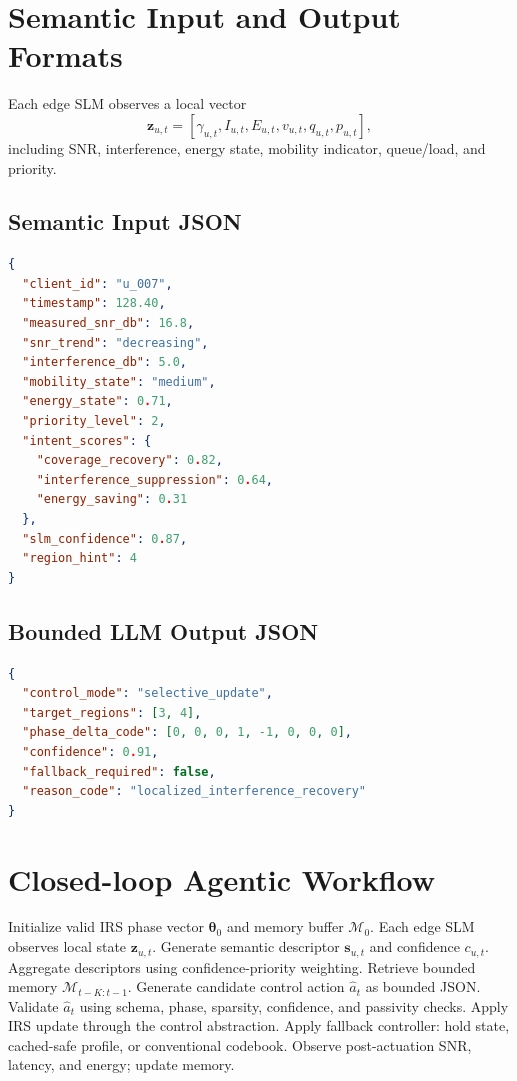 \documentclass[11pt]{article}
\begin{document}
\section{Semantic Input and Output Formats}
Each edge SLM observes a local vector
\begin{equation}
\mathbf{z}_{u,t}=[\gamma_{u,t},I_{u,t},E_{u,t},v_{u,t},q_{u,t},p_{u,t}],
\end{equation}
including SNR, interference, energy state, mobility indicator, queue/load, and priority.

\subsection{Semantic Input JSON}
\begin{lstlisting}[language=json]
{
  "client_id": "u_007",
  "timestamp": 128.40,
  "measured_snr_db": 16.8,
  "snr_trend": "decreasing",
  "interference_db": 5.0,
  "mobility_state": "medium",
  "energy_state": 0.71,
  "priority_level": 2,
  "intent_scores": {
    "coverage_recovery": 0.82,
    "interference_suppression": 0.64,
    "energy_saving": 0.31
  },
  "slm_confidence": 0.87,
  "region_hint": 4
}
\end{lstlisting}

\subsection{Bounded LLM Output JSON}
\begin{lstlisting}[language=json]
{
  "control_mode": "selective_update",
  "target_regions": [3, 4],
  "phase_delta_code": [0, 0, 0, 1, -1, 0, 0, 0],
  "confidence": 0.91,
  "fallback_required": false,
  "reason_code": "localized_interference_recovery"
}
\end{lstlisting}

\section{Closed-loop Agentic Workflow}
\begin{algorithm}[h]
\caption{Closed-loop LAMI reasoning and IRS actuation}
\begin{algorithmic}[1]
\State Initialize valid IRS phase vector $\boldsymbol{\theta}_0$ and memory buffer $\mathcal{M}_0$.
    \State Each edge SLM observes local state $\mathbf{z}_{u,t}$.
    \State Generate semantic descriptor $\mathbf{s}_{u,t}$ and confidence $c_{u,t}$.
    \State Aggregate descriptors using confidence-priority weighting.
    \State Retrieve bounded memory $\mathcal{M}_{t-K:t-1}$.
    \State Generate candidate control action $\hat{a}_t$ as bounded JSON.
    \State Validate $\hat{a}_t$ using schema, phase, sparsity, confidence, and passivity checks.
        \State Apply IRS update through the control abstraction.
    \Else
        \State Apply fallback controller: hold state, cached-safe profile, or conventional codebook.
    \EndIf
    \State Observe post-actuation SNR, latency, and energy; update memory.
\EndFor
\end{algorithmic}
\end{algorithm}
\end{document}

